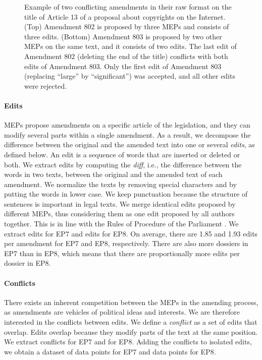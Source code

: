 \begin{figure}
  \centering
	\newcommand{\imgscale}{\linewidth*3/4}
	{%
		\setlength{\fboxsep}{5.5pt}%
		\setlength{\fboxrule}{0.5pt}%
	}%
	\vfill
	\vspace{4pt}
	{%
		\setlength{\fboxsep}{5.5pt}%
		\setlength{\fboxrule}{0.5pt}%
	}%
	\caption{
		Example of two conflicting amendments in their raw format on the title of Article 13 of a proposal about copyrights on the Internet.
		(Top) Amendment 802 is proposed by three MEPs and consists of three edits.
		(Bottom) Amendment 803 is proposed by two other MEPs on the same text, and it consists of two edits.
		The last edit of Amendment 802 (deleting the end of the title) conflicts with both edits of Amendment 803.
		Only the first edit of Amendment 803 (replacing ``large'' by ``significant'') was accepted, and all other edits were rejected.
	}
	\label{fig:amendment}
\end{figure}

\paragraph{Edits}
MEPs propose amendments on a specific article of the legislation, and they can modify several parts within a single amendment.
As a result, we decompose the difference between the original and the amended text into one or several \emph{edits}, as defined below.
An edit is a sequence of words that are inserted or deleted or both.
We extract edits by computing the \emph{diff}, i.e., the difference between the words in two texts, between the original and the amended text of each amendment.
We normalize the texts by removing special characters and by putting the words in lower case.
We keep punctuation because the structure of sentences is important in legal texts.
We merge identical edits proposed by different MEPs, thus considering them as one edit proposed by all authors together.
This is in line with the Rules of Procedure of the Parliament \cite{europarl2018rules}.
We extract  edits for EP7 and  edits for EP8.
On average, there are 1.85 and 1.93 edits per amendment for EP7 and EP8, respectively.
There are also more dossiers in EP7 than in EP8, which means that there are proportionally more edits per dossier in EP8.

\paragraph{Conflicts}
There exists an inherent competition between the MEPs in the amending process, as amendments are vehicles of political ideas and interests.
We are therefore interested in the conflicts between edits.
We define a \emph{conflict} as a set of edits that overlap.
Edits overlap because they modify parts of the text at the same position.
We extract  conflicts for EP7 and  for EP8.
Adding the conflicts to isolated edits, we obtain a dataset of  data points for EP7 and  data points for EP8.

